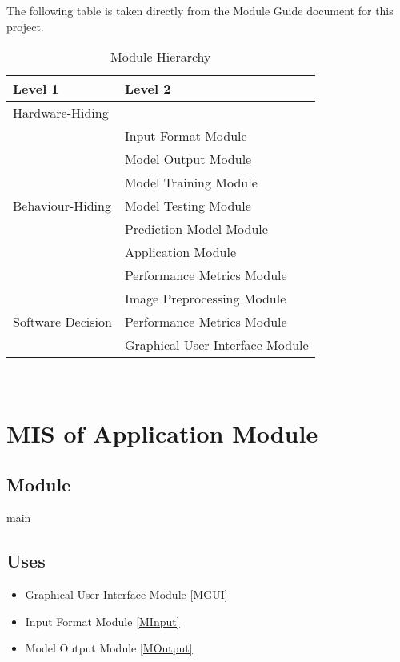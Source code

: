 \documentclass[12pt, titlepage]{article}
\begin{document}
The following table is taken directly from the Module Guide document for this project.

\begin{table}[h!]
\centering
\begin{tabular}{p{} p{}}
\toprule
\textbf{Level 1} & \textbf{Level 2}\\
\midrule

{Hardware-Hiding} & ~ \\
\midrule

\multirow{7}{0.3\textwidth}{Behaviour-Hiding} &
Input Format Module\\
& Model Output Module\\
& Model Training Module\\
& Model Testing Module\\
& Prediction Model Module\\
& Application Module\\
& Performance Metrics Module\\
\midrule

\multirow{3}{0.3\textwidth}{Software Decision} &
Image Preprocessing Module\\
& Performance Metrics Module\\
& Graphical User Interface Module\\
\bottomrule

\end{tabular}
\caption{Module Hierarchy}
\label{TblMH}
\end{table}

\newpage
~\newpage

\section{MIS of Application Module} \label{MApplication}

\subsection{Module}

main

\subsection{Uses}

\begin{itemize}
  \item Graphical User Interface Module \ref{MGUI}
  \item Input Format Module \ref{MInput}
  \item Model Output Module \ref{MOutput}
\end{itemize}
\end{document}
